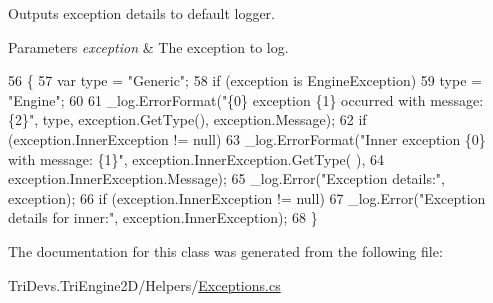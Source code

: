 Outputs exception details to default logger. 


\begin{DoxyParams}{Parameters}
{\em exception} & The exception to log.\\
\hline
\end{DoxyParams}

\begin{DoxyCode}
56         \{
57             var type = \textcolor{stringliteral}{"Generic"};
58             \textcolor{keywordflow}{if} (exception is EngineException)
59                 type = \textcolor{stringliteral}{"Engine"};
60 
61             \_log.ErrorFormat(\textcolor{stringliteral}{"\{0\} exception \{1\} occurred with message: \{2\}"}, type, exception.GetType(), 
      exception.Message);
62             \textcolor{keywordflow}{if} (exception.InnerException != null)
63                 \_log.ErrorFormat(\textcolor{stringliteral}{"Inner exception \{0\} with message: \{1\}"}, exception.InnerException.GetType(
      ),
64                                  exception.InnerException.Message);
65             \_log.Error(\textcolor{stringliteral}{"Exception details:"}, exception);
66             \textcolor{keywordflow}{if} (exception.InnerException != null)
67                 \_log.Error(\textcolor{stringliteral}{"Exception details for inner:"}, exception.InnerException);
68         \}
\end{DoxyCode}


The documentation for this class was generated from the following file\-:\begin{DoxyCompactItemize}
\item 
Tri\-Devs.\-Tri\-Engine2\-D/\-Helpers/\hyperlink{_exceptions_8cs}{Exceptions.\-cs}\end{DoxyCompactItemize}
